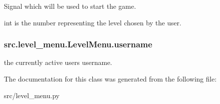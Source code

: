 Signal which will be used to start the game. 

int is the number representing the level chosen by the user. \hypertarget{classsrc_1_1level__menu_1_1_level_menu_aee1d2148e23a2908c72c4a8f8ad0a98f}{}
\subsubsection[{username}]{\setlength{\rightskip}{0pt plus 5cm}src.\+level\+\_\+menu.\+Level\+Menu.\+username}\label{classsrc_1_1level__menu_1_1_level_menu_aee1d2148e23a2908c72c4a8f8ad0a98f}


the currently active user\textquotesingle{}s username. 



The documentation for this class was generated from the following file\+:\begin{DoxyCompactItemize}
\item 
src/level\+\_\+menu.\+py\end{DoxyCompactItemize}
